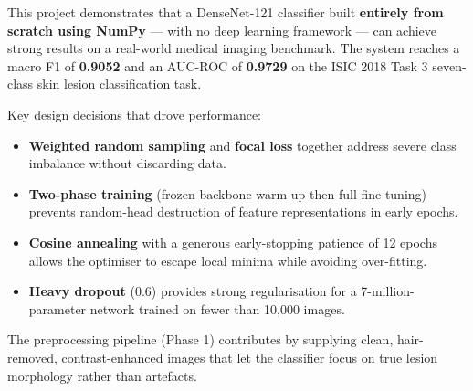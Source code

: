 \documentclass[12pt,a4paper]{report}
\begin{document}
This project demonstrates that a DenseNet-121 classifier built \textbf{entirely from scratch using NumPy} — with no deep learning framework — can achieve strong results on a real-world medical imaging benchmark. The system reaches a macro F1 of \textbf{0.9052} and an AUC-ROC of \textbf{0.9729} on the ISIC 2018 Task 3 seven-class skin lesion classification task.

Key design decisions that drove performance:
\begin{itemize}
  \item \textbf{Weighted random sampling} and \textbf{focal loss} together address severe class imbalance without discarding data.
  \item \textbf{Two-phase training} (frozen backbone warm-up then full fine-tuning) prevents random-head destruction of feature representations in early epochs.
  \item \textbf{Cosine annealing} with a generous early-stopping patience of 12 epochs allows the optimiser to escape local minima while avoiding over-fitting.
  \item \textbf{Heavy dropout} (0.6) provides strong regularisation for a 7-million-parameter network trained on fewer than 10{,}000 images.
\end{itemize}

The preprocessing pipeline (Phase 1) contributes by supplying clean, hair-removed, contrast-enhanced images that let the classifier focus on true lesion morphology rather than artefacts.
\end{document}
